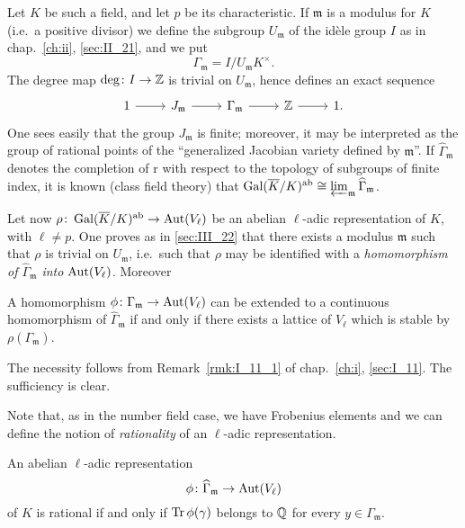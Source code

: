 Let $K$ be such a field, and let $p$ be its characteristic. If $\mathfrak{m}$
is a modulus for $K$ (i.e.\ a positive divisor) we define the subgroup
$U_{\mathfrak{m}}$ of the idèle group $I$ as in chap.~\ref{ch:ii},
\ref{sec:II_21}, and we put
\[
	\Gamma_{\mathfrak{m}} = I/U_{\mathfrak{m}} K^\times.
\]
\dpage
The degree map $\deg\colon I \to \mathbb{Z}$ is trivial on $U_{\mathfrak{m}}$, hence defines an
exact sequence
\[\begin{tikzcd}
	1 \rar & J_{\mathfrak{m}} \rar & \Gamma_{\mathfrak{m}} \rar & \Z \rar & 1.
\end{tikzcd}\]
One sees easily that the group $J_{\mathfrak{m}}$ is finite; moreover, it may
be interpreted as the group of rational points of the ``generalized Jacobian
variety defined by $\mathfrak{m}$''. If $\widehat{\Gamma}_{\mathfrak{m}}$
denotes the completion of r with respect to the topology of subgroups of finite
index, it is known (class field theory) that $\operatorname{Gal}(\overline{K}/K)^{\mathrm{ab}} \cong
\varprojlim_{\mathfrak{m}} \widehat{\Gamma}_{\mathfrak{m}}$.

Let now $\rho\colon \operatorname{Gal}(\overline{K}/K)^{\mathrm{ab}} \to \operatorname{Aut}(V_\ell)$ be an abelian
$\ell$-adic representation of $K$, with $\ell \ne p$. One proves as in
\ref{sec:III_22} that there exists a modulus $\mathfrak{m}$ such that $\rho$ is
trivial on $U_{\mathfrak{m}}$, i.e.\ such that $\rho$ may be identified with a
\emph{homomorphism of $\widehat{\Gamma}_{\mathfrak{m}}$ into $\operatorname{Aut}(V_\ell)$.}
Moreover

\begin{prop}
	A homomorphism $\phi\colon \Gamma_{\mathfrak{m}} \to \operatorname{Aut}(V_\ell)$
	can be extended to a continuous homomorphism of
	$\widehat{\Gamma}_{\mathfrak{m}}$ if and only if there exists a lattice
	of $V_\ell$ which is stable by $\rho(\Gamma_{\mathfrak{m}})$.
\end{prop}

The necessity follows from Remark~\ref{rmk:I_11_1} of chap.~\ref{ch:i},
\ref{sec:I_11}. The sufficiency is clear.

Note that, as in the number field case, we have Frobenius
elements and we can define the notion of \emph{rationality} of an $\ell$-adic
representation.

\begin{thm}
	An abelian $\ell$-adic representation
	\[
		\phi \colon \widehat{\Gamma}_{\mathfrak{m}} \to \operatorname{Aut}(V_\ell)
	\]
	\dpage
	of $K$ is rational if and only if $\operatorname{Tr}\phi(\gamma)$ belongs to $\mathbb{Q}$
	for every $y \in \Gamma_{\mathfrak{m}}$.
\end{thm}

